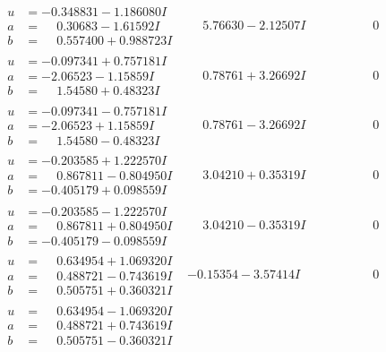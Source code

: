 \documentclass[1p]{elsarticle_modified}
\theoremstyle{definition}
\begin{document}
$$\begin{array}{c|c|c}
\begin{aligned}
u &= -0.348831 - 1.186080 I \\
a &= \phantom{-}0.30683 - 1.61592 I \\
b &= \phantom{-}0.557400 + 0.988723 I\end{aligned}
 & \phantom{-}5.76630 - 2.12507 I & \phantom{-0.000000 } 0 \\ \hline\begin{aligned}
u &= -0.097341 + 0.757181 I \\
a &= -2.06523 - 1.15859 I \\
b &= \phantom{-}1.54580 + 0.48323 I\end{aligned}
 & \phantom{-}0.78761 + 3.26692 I & \phantom{-0.000000 } 0 \\ \hline\begin{aligned}
u &= -0.097341 - 0.757181 I \\
a &= -2.06523 + 1.15859 I \\
b &= \phantom{-}1.54580 - 0.48323 I\end{aligned}
 & \phantom{-}0.78761 - 3.26692 I & \phantom{-0.000000 } 0 \\ \hline\begin{aligned}
u &= -0.203585 + 1.222570 I \\
a &= \phantom{-}0.867811 - 0.804950 I \\
b &= -0.405179 + 0.098559 I\end{aligned}
 & \phantom{-}3.04210 + 0.35319 I & \phantom{-0.000000 } 0 \\ \hline\begin{aligned}
u &= -0.203585 - 1.222570 I \\
a &= \phantom{-}0.867811 + 0.804950 I \\
b &= -0.405179 - 0.098559 I\end{aligned}
 & \phantom{-}3.04210 - 0.35319 I & \phantom{-0.000000 } 0 \\ \hline\begin{aligned}
u &= \phantom{-}0.634954 + 1.069320 I \\
a &= \phantom{-}0.488721 - 0.743619 I \\
b &= \phantom{-}0.505751 + 0.360321 I\end{aligned}
 & -0.15354 - 3.57414 I & \phantom{-0.000000 } 0 \\ \hline\begin{aligned}
u &= \phantom{-}0.634954 - 1.069320 I \\
a &= \phantom{-}0.488721 + 0.743619 I \\
b &= \phantom{-}0.505751 - 0.360321 I\end{aligned}

\end{array}$$
\end{document}
